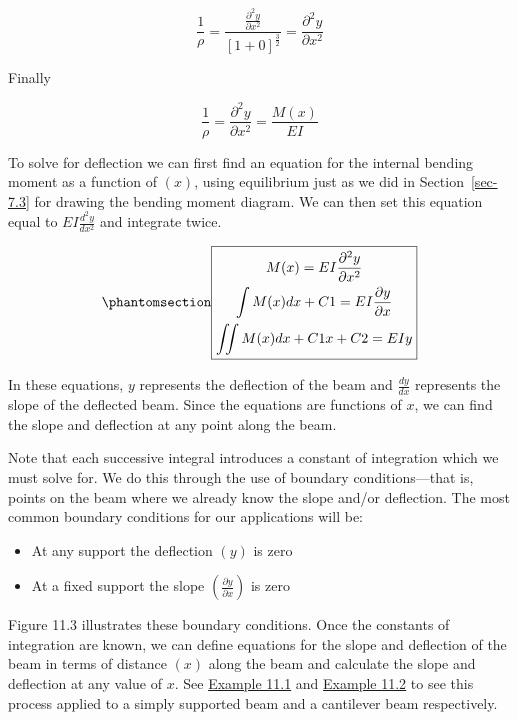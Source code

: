 \documentclass[
  letterpaper,
  DIV=11,
  numbers=noendperiod]{scrreprt}
\theoremstyle{definition}
\theoremstyle{remark}
\begin{document}
\[
\frac{1}{\rho}=\frac{\frac{\partial^{2} y}{\partial x^{2}}}{[1+0]^{\frac{3}{2}}}=\frac{\partial^{2} y}{\partial x^{2}}
\]

Finally

\[
\frac{1}{\rho}=\frac{\partial^{2} y}{\partial x^{2}}=\frac{M(x)}{E I}
\]

To solve for deflection we can first find an equation for the internal
bending moment as a function of \((x)\), using equilibrium just as we
did in Section~\ref{sec-7.3} for drawing the bending moment diagram. We
can then set this equation equal to \(E I \frac{d^{2} y}{d x^{2}}\) and
integrate twice.

\begin{equation}\phantomsection\label{eq-11.1}{
\boxed{\begin{gathered}
M(x)=E I \frac{\partial^{2} y}{\partial x^{2}} \\
\int M(x) d x+C 1=E I \frac{\partial y}{\partial x} \\
\iint M(x) d x+C 1 x+C 2=E I y
\end{gathered}}
}\end{equation}

In these equations, \(y\) represents the deflection of the beam and
\(\frac{d y}{d x}\) represents the slope of the deflected beam. Since
the equations are functions of \(x\), we can find the slope and
deflection at any point along the beam.

Note that each successive integral introduces a constant of integration
which we must solve for. We do this through the use of boundary
conditions---that is, points on the beam where we already know the slope
and/or deflection. The most common boundary conditions for our
applications will be:

\begin{itemize}
\item
  At any support the deflection \((y)\) is zero
\item
  At a fixed support the slope
  \(\left(\frac{\partial y}{\partial x}\right)\) is zero
\end{itemize}

Figure 11.3 illustrates these boundary conditions. Once the constants of
integration are known, we can define equations for the slope and
deflection of the beam in terms of distance \((x)\) along the beam and
calculate the slope and deflection at any value of \(x\). See
\hyperref[example-11.1]{Example 11.1} and
\hyperref[example-11.2]{Example 11.2} to see this process applied to a
simply supported beam and a cantilever beam respectively.
\end{document}
